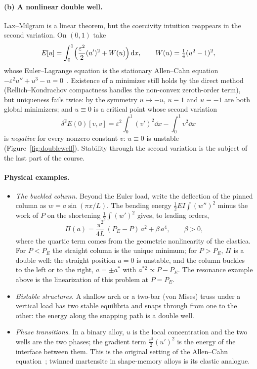 \paragraph{(b) A nonlinear double well.} Lax--Milgram is a linear theorem, but
%
the coercivity intuition reappears in the second variation. On $(0,1)$ take
\[
  E[u]=\int_0^1\Bigl(\frac{\varepsilon^2}{2}(u')^2+W(u)\Bigr)\,\mathrm{d} x,
  \qquad W(u)=\tfrac14(u^2-1)^2,
\]
whose Euler--Lagrange equation is the stationary Allen--Cahn equation
$-\varepsilon^2u''+u^3-u=0$~\cite{AllenCahn1979}. Existence of a minimizer
still holds by the direct method (Rellich--Kondrachov compactness handles the
non-convex zeroth-order term), but uniqueness fails twice: by the symmetry
$u\mapsto-u$, $u\equiv1$ and $u\equiv-1$ are both global minimizers; and
$u\equiv0$ is a critical point whose second variation
\[
  \delta^2E(0)[v,v]=\varepsilon^2\int_0^1(v')^2\dd x-\int_0^1v^2\dd x
\]
is \emph{negative} for every nonzero constant $v$: $u\equiv0$ is unstable
(Figure~\ref{fig:doublewell}). Stability through the second variation is the
subject of the last part of the course.

\paragraph{Physical examples.}
%
\begin{itemize}
\item \emph{The buckled column.} Beyond the Euler load, write the deflection
of the pinned column as $w=a\sin(\pi x/L)$. The bending energy
$\displaystyle \tfrac12EI\int(w'')^2$ minus the work of $P$ on the shortening
$\displaystyle \tfrac12\int(w')^2$ gives, to leading orders,
\[
  \Pi(a)=\frac{\pi^2}{4L}\,(P_E-P)\,a^2+\beta\,a^4,\qquad\beta>0,
\]
where the quartic term comes from the geometric nonlinearity of the elastica.
For $P<P_E$ the straight column is the unique minimum; for $P>P_E$, $\Pi$ is a
double well: the straight position $a=0$ is unstable, and the column buckles
to the left or to the right, $a=\pm a^\ast$ with $a^{\ast2}\propto P-P_E$. The
resonance example above is the linearization of this problem at $P=P_E$.
\item \emph{Bistable structures.} A shallow arch or a two-bar (von Mises)
truss under a vertical load has two stable equilibria and snaps through from
one to the other: the energy along the snapping path is a double well.
\item \emph{Phase transitions.} In a binary alloy, $u$ is the local
concentration and the two wells are the two phases; the gradient term
$\tfrac{\varepsilon^2}{2}(u')^2$ is the energy of the interface between them.
This is the original setting of the Allen--Cahn
equation~\cite{AllenCahn1979}; twinned martensite in shape-memory alloys is
its elastic analogue.
\end{itemize}

